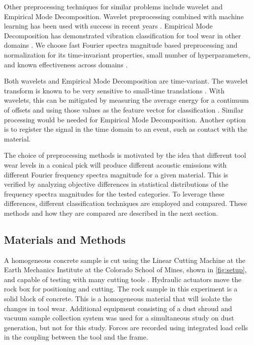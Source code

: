 Other preprocessing techniques for similar problems include wavelet and Empirical Mode Decomposition.
Wavelet preprocessing combined with machine learning
has been used with success in recent years 
 \cite{he2013vibration, sadegh2016classification, skariah2021health}.
Empirical Mode Decomposition has demonstrated vibration classification for tool wear
 in other domains \cite{Xu2009, Nie2011, Zhan2014}.
We choose fast Fourier spectra magnitude based preprocessing and normalization for its time-invariant properties,
small number of hyperparameters, and known effectiveness across domains \cite{Xu2016, Harlianto2022}.

Both wavelets and Empirical Mode Decomposition are time-variant.
The wavelet transform is known to be very sensitive to small-time translations \cite{Yen1999}.
With wavelets, this can be mitigated by measuring the average energy for 
a continuum of offsets and using those values 
as the feature vector for classification \cite{Baccar2015}.
Similar processing would be needed for Empirical Mode Decomposition. 
Another option is to register the signal in the time domain to an event, such as contact with the material.

The choice of preprocessing methods is motivated by the idea that different tool wear levels in a conical pick 
will produce different acoustic emissions with different Fourier frequency spectra magnitude for a given material. 
This is verified by analyzing objective differences in statistical distributions of the frequency spectra magnitudes 
for the tested categories. To leverage these differences, different classification techniques are employed and compared. 
These methods and how they are compared are described in the next section.

\subsection{Materials and Methods}\label{sec2}

A homogeneous concrete sample is cut using the Linear Cutting Machine
at the Earth Mechanics Institute at the Colorado School of Mines, shown in \ref{fig:setup},
and capable of testing with many cutting tools \cite{THYAGARAJAN2024105675}. 
Hydraulic actuators move the rock box for positioning and cutting. The rock sample in this experiment
is a solid block of concrete. This is a homogeneous material that will isolate the changes in tool wear.
Additional equipment consisting of a dust shroud and vacuum sample collection system was used for a
 simultaneous study on dust generation, but not for this study.
Forces are recorded using integrated load cells in the coupling between the tool and the frame.

